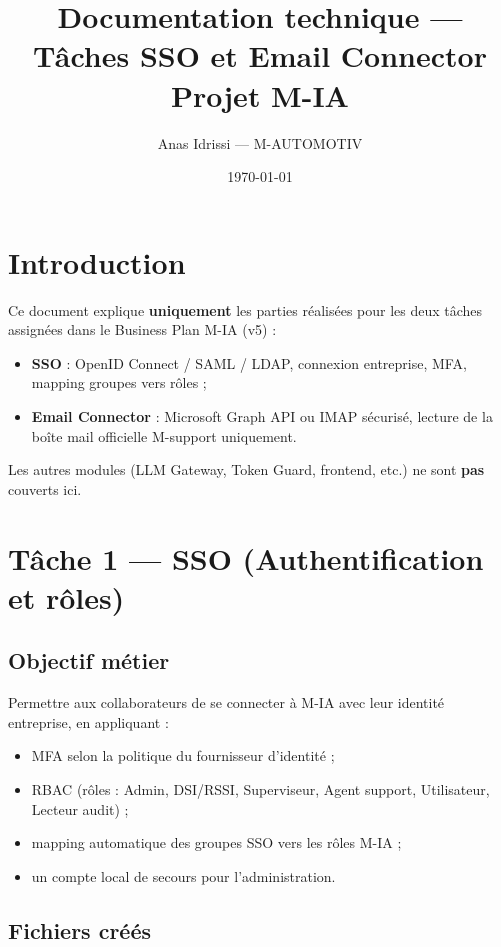 \documentclass[12pt,a4paper]{article}
\title{Documentation technique --- Tâches SSO et Email Connector\\Projet M-IA}
\author{Anas Idrissi --- M-AUTOMOTIV}
\date{\today}
\begin{document}
\maketitle
\tableofcontents
\newpage

\section{Introduction}

Ce document explique \textbf{uniquement} les parties réalisées pour les deux tâches assignées dans le Business Plan M-IA (v5) :
\begin{itemize}[leftmargin=*]
  \item \textbf{SSO} : OpenID Connect / SAML / LDAP, connexion entreprise, MFA, mapping groupes vers rôles ;
  \item \textbf{Email Connector} : Microsoft Graph API ou IMAP sécurisé, lecture de la boîte mail officielle M-support uniquement.
\end{itemize}

Les autres modules (LLM Gateway, Token Guard, frontend, etc.) ne sont \textbf{pas} couverts ici.

\section{Tâche 1 --- SSO (Authentification et rôles)}

\subsection{Objectif métier}

Permettre aux collaborateurs de se connecter à M-IA avec leur identité entreprise, en appliquant :
\begin{itemize}
  \item MFA selon la politique du fournisseur d'identité ;
  \item RBAC (rôles : Admin, DSI/RSSI, Superviseur, Agent support, Utilisateur, Lecteur audit) ;
  \item mapping automatique des groupes SSO vers les rôles M-IA ;
  \item un compte local de secours pour l'administration.
\end{itemize}

\subsection{Fichiers créés}
\end{document}
